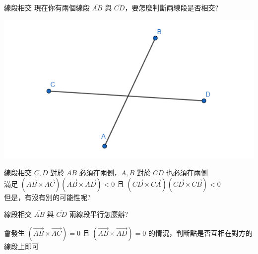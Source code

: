 \documentclass[aspectratio=169]{beamer}
\begin{document}
\begin{frame}[fragile]{線段相交}
    現在你有兩個線段 $\overline{AB}$ 與 $\overline{CD}$，要怎麼判斷兩線段是否相交?
    \begin{center}
        \includegraphics[scale=0.5]{images/segment_intersect.png}
    \end{center}
\end{frame}

\begin{frame}[fragile]{線段相交}
    $C,D$ 對於 $\overline{AB}$ 必須在兩側，$A,B$ 對於 $\overline{CD}$ 也必須在兩側 \\
    \vspace{5mm}
    滿足 $(\overrightarrow{AB} \times \overrightarrow{AC})(\overrightarrow{AB} \times \overrightarrow{AD}) < 0$ 且 $(\overrightarrow{CD} \times \overrightarrow{CA})(\overrightarrow{CD} \times \overrightarrow{CB}) < 0$ \\
    \vspace{5mm}
    但是，有沒有別的可能性呢?
\end{frame}

\begin{frame}[fragile]{線段相交}
    $\overline{AB}$ 與 $\overline{CD}$ 兩線段平行怎麼辦? \pause
    \begin{figure}
    \hspace{5mm}
    \end{figure}
    會發生 $(\overrightarrow{AB} \times \overrightarrow{AC}) = 0$ 且 $(\overrightarrow{AB} \times \overrightarrow{AD}) = 0$ 的情況，判斷點是否互相在對方的線段上即可
\end{frame}
\end{document}

